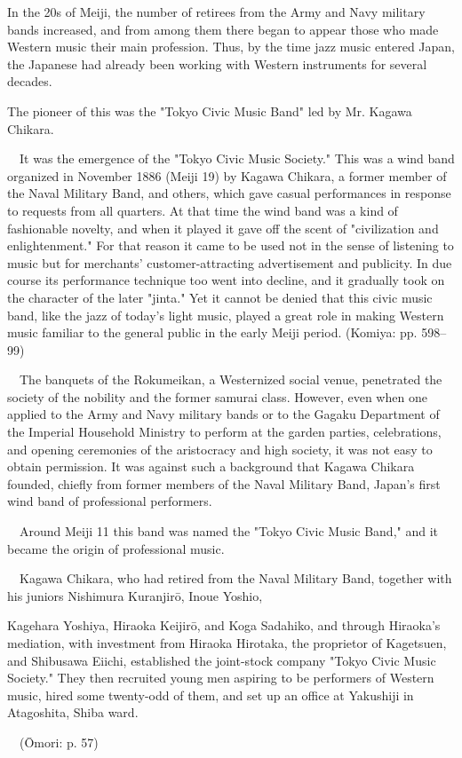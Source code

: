 In the 20s of Meiji, the number of retirees from the Army and Navy military bands increased, and from among them there began to appear those who made Western music their main profession. Thus, by the time jazz music entered Japan, the Japanese had already been working with Western instruments for several decades.

The pioneer of this was the "Tokyo Civic Music Band" led by Mr. Kagawa Chikara.

\begin{gquote}
　It was the emergence of the "Tokyo Civic Music Society." This was a wind band organized in November 1886 (Meiji 19) by Kagawa Chikara, a former member of the Naval Military Band, and others, which gave casual performances in response to requests from all quarters. At that time the wind band was a kind of fashionable novelty, and when it played it gave off the scent of "civilization and enlightenment." For that reason it came to be used not in the sense of listening to music but for merchants' customer-attracting advertisement and publicity. In due course its performance technique too went into decline, and it gradually took on the character of the later "jinta." Yet it cannot be denied that this civic music band, like the jazz of today's light music, played a great role in making Western music familiar to the general public in the early Meiji period. (Komiya: pp. 598–99)
\end{gquote}

\begin{gquote}
　The banquets of the Rokumeikan, a Westernized social venue, penetrated the society of the nobility and the former samurai class. However, even when one applied to the Army and Navy military bands or to the Gagaku Department of the Imperial Household Ministry to perform at the garden parties, celebrations, and opening ceremonies of the aristocracy and high society, it was not easy to obtain permission. It was against such a background that Kagawa Chikara founded, chiefly from former members of the Naval Military Band, Japan's first wind band of professional performers.\par{}　Around Meiji 11 this band was named the "Tokyo Civic Music Band," and it became the origin of professional music.\par{}　Kagawa Chikara, who had retired from the Naval Military Band, together with his juniors Nishimura Kuranjirō, Inoue Yoshio,
\end{gquote}

\begin{gquote}
Kagehara Yoshiya, Hiraoka Keijirō, and Koga Sadahiko, and through Hiraoka's mediation, with investment from Hiraoka Hirotaka, the proprietor of Kagetsuen, and Shibusawa Eiichi, established the joint-stock company "Tokyo Civic Music Society." They then recruited young men aspiring to be performers of Western music, hired some twenty-odd of them, and set up an office at Yakushiji in Atagoshita, Shiba ward.\par{}　(Ōmori: p. 57)
\end{gquote}

